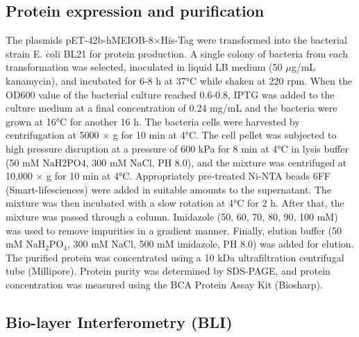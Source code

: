 \documentclass[unnumsec,webpdf,contemporary,large]{oup-authoring-template}%
\theoremstyle{thmstyleone}%
\theoremstyle{thmstyletwo}%
\theoremstyle{thmstylethree}%
\begin{document}
\subsection*{Protein expression and purification}

The plasmids pET-42b-hMEIOB-8×His-Tag were transformed into the bacterial strain E. coli BL21 for protein production. A single colony of bacteria from each transformation was selected, inoculated in liquid LB medium (50 $\mu$g/mL kanamycin), and incubated for 6-8 h at 37°C while shaken at 220 rpm. When the OD600 value of the bacterial culture reached 0.6-0.8, IPTG was added to the culture medium at a final concentration of 0.24 mg/mL and the bacteria were grown at 16°C for another 16 h. The bacteria cells were harvested by centrifugation at 5000 × g for 10 min at 4°C. The cell pellet was subjected to high pressure disruption at a pressure of 600 kPa for 8 min at 4°C in lysis buffer (50 mM NaH2PO4, 300 mM NaCl, PH 8.0), and the mixture was centrifuged at 10,000 × g for 10 min at 4°C. Appropriately pre-treated Ni-NTA beads 6FF (Smart-lifesciences) were added in suitable amounts to the supernatant. The mixture was then incubated with a slow rotation at 4°C for 2 h. After that, the mixture was passed through a column. Imidazole (50, 60, 70, 80, 90, 100 mM) was used to remove impurities in a gradient manner. Finally, elution buffer (50 mM NaH$_2$PO$_4$, 300 mM NaCl, 500 mM imidazole, PH 8.0) was added for elution. The purified protein was concentrated using a 10 kDa ultrafiltration centrifugal tube (Millipore). Protein purity was determined by SDS-PAGE, and protein concentration was measured using the BCA Protein Assay Kit (Biosharp).


\subsection*{Bio-layer Interferometry (BLI)}
\end{document}
